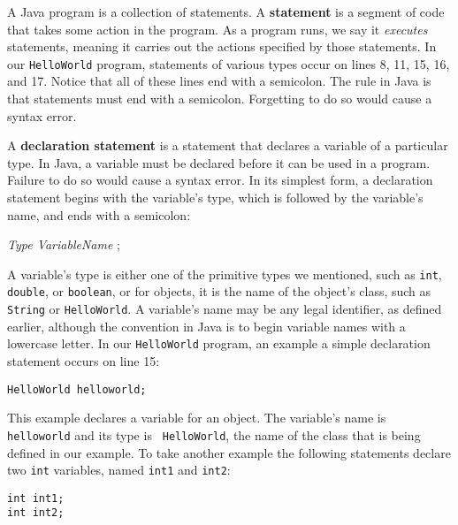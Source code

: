 A Java program is a collection of statements. A {\bf statement} is a
segment of code that takes some action in the program. As a program runs,
we say it {\em executes} statements, meaning it carries out the actions
specified by those statements.  In our {\tt HelloWorld} program, statements
of various types occur on lines 8, 11, 15, 16, and 17. Notice that all
of these lines end with a semicolon. The rule in Java is that statements
must end with a semicolon. Forgetting to do so would cause a syntax error.

A {\bf declaration statement} is a statement that declares a variable
of a particular type. In Java, a variable must be declared before it
can be used in a program. Failure to do so would cause a syntax error.
In its simplest form, a declaration statement begins with the
variable's type, which is followed by the variable's name, and ends
with a semicolon:

\begin{extract}
{\it Type VariableName} ;
\end{extract}

\noindent A variable's type is either one of the primitive types
we mentioned, such as {\tt int}, {\tt double}, or {\tt boolean}, or
for objects, it is the name of the object's class, such as {\tt
String} or {\tt HelloWorld}. A variable's name may be any legal
identifier, as defined earlier, although the convention in Java is to
begin variable names with a lowercase letter.  In our {\tt HelloWorld}
program, an example a simple declaration statement occurs on line 15:

\begin{jjjlisting}
\begin{lstlisting}
HelloWorld helloworld;                    
\end{lstlisting}
\end{jjjlisting}

\noindent This example declares a variable for an
object.  The variable's name is {\tt helloworld} and its type is {\tt
HelloWorld}, the name of the class that is being defined in our
example.  To take another example the following statements declare two
{\tt int} variables, named {\tt int1} and {\tt int2}:

\begin{jjjlisting}
\begin{lstlisting}
int int1; 
int int2;
\end{lstlisting}
\end{jjjlisting}

